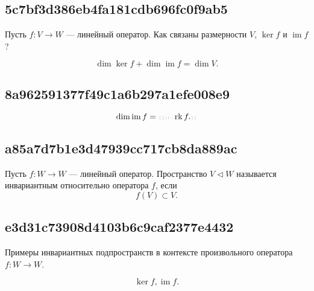 \documentclass[11pt, a5paper]{article}
\newenvironment{note}[1]{\goodbreak\par\subsection{\hfill \color{lightgray}\tiny #1}}{}
\newenvironment{cloze}[2][\ldots]{\begin{leftbar}}{\end{leftbar}}
\newenvironment{icloze}[2][\ldots]{%
  \ignorespaces\text{\tiny \color{lightgray} \{\{c#2::}\hspace{0pt}%
}{%
  \hspace{0pt}\text{\tiny \color{lightgray}\}\}}\unskip%
}
\begin{document}
\begin{note}{5c7bf3d386eb4fa181cdb696fc0f9ab5}
    Пусть \( f : V \to W \) --- линейный оператор. Как связаны размерности \( V \), \( \ker f \) и \( \operatorname{im} f \)?

    \begin{cloze}{1}
        \[
            \dim \ker f + \dim \operatorname{im} f = \dim V.
        \]
    \end{cloze}
\end{note}

\begin{note}{8a962591377f49c1a6b297a1efe008e9}
    \[
        \dim \operatorname{im} f = \begin{icloze}{1}\operatorname{rk} f.\end{icloze}
    \]
\end{note}

\begin{note}{a85a7d7b1e3d47939cc717cb8da889ac}
    Пусть \( f : W \to W \) --- линейный оператор. \begin{icloze}{1}Пространство \( V \triangleleft W \)\end{icloze} называется \begin{icloze}{2}инвариантным относительно оператора \( f \),\end{icloze} если
    \begin{icloze}{1}\[
        f(V) \subset V.
    \]\end{icloze}
\end{note}

\begin{note}{e3d31c73908d4103b6c9caf2377e4432}
    Примеры инвариантных подпространств в контексте произвольного оператора \( f : W \to W \).

    \begin{cloze}{1}
        \[
            \ker f, \operatorname{im} f.
        \]
    \end{cloze}
\end{note}
\end{document}
